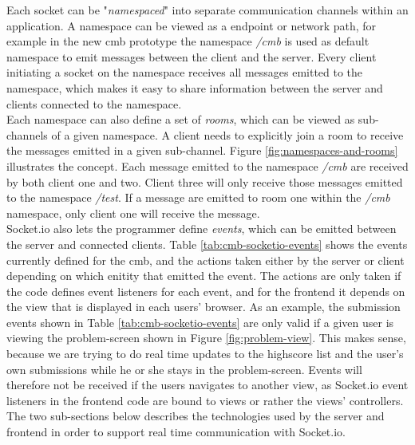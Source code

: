 Each socket can be "\textit{namespaced}" into separate communication channels within an application. A namespace can be viewed as a endpoint or network path, for example in the new \gls{cmb} prototype the namespace \textit{/cmb} is used as default namespace to emit messages between the client and the server. Every client initiating a socket on the namespace receives all messages emitted to the namespace, which makes it easy to share information between the server and clients connected to the namespace. \\

Each namespace can also define a set of \textit{rooms}, which can be viewed as sub-channels of a given namespace. A client needs to explicitly join a room to receive the messages emitted in a given sub-channel. Figure \ref{fig:namespaces-and-rooms} illustrates the concept. Each message emitted to the namespace \textit{/cmb} are received by both client one and two. Client three will only receive those messages emitted to the namespace \textit{/test}. If a message are emitted to room one within the \textit{/cmb} namespace, only client one will receive the message. \\

Socket.io also lets the programmer define \textit{events}, which can be emitted between the server and connected clients. Table \ref{tab:cmb-socketio-events} shows the events currently defined for the \gls{cmb}, and the actions taken either by the server or client depending on which enitity that emitted the event. The actions are only taken if the code defines event listeners for each event, and for the frontend it depends on the view that is displayed in each users' browser. As an example, the submission events shown in Table \ref{tab:cmb-socketio-events} are only valid if a given user is viewing the problem-screen shown in Figure \ref{fig:problem-view}. This makes sense, because we are trying to do real time updates to the highscore list and the user's own submissions while he or she stays in the problem-screen. Events will therefore not be received if the users navigates to another view, as Socket.io event listeners in the frontend code are bound to views or rather the views' controllers.  \\

The two sub-sections below describes the technologies used by the server and frontend in order to support real time communication with Socket.io.


